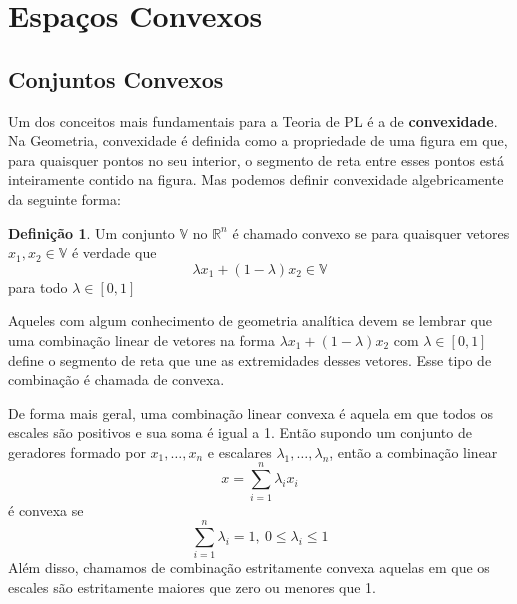 \theoremstyle{definition}

\newtheorem{def:conjunto convexo}{Definição}[chapter]

\newtheorem{def:politopo}[def:conjunto convexo]{Definição}

\newtheorem{def:poliedro convexo}[def:conjunto convexo]{Definição}

\newtheorem{def:cone}[def:conjunto convexo]{Definição}

\newtheorem{def:cone hull}[def:conjunto convexo]{Definição}

\newtheorem{def:cone convexo}[def:conjunto convexo]{Definição}

\newtheorem{def:cpc}[def:conjunto convexo]{Definição}



\section{Espaços Convexos}

\subsection{Conjuntos Convexos}

Um dos conceitos mais fundamentais para a Teoria de PL é a de \textbf{convexidade}. Na Geometria, convexidade é definida como a propriedade de uma figura em que, para quaisquer pontos no seu interior, o segmento de reta entre esses pontos está inteiramente contido na figura. Mas podemos definir convexidade algebricamente da seguinte forma:

\begin{def:conjunto convexo}
	\label{def:conjunto convexo}
	Um conjunto $\mathbb{V}$ no $\mathbb{R}^n$ é chamado convexo se para quaisquer vetores $x_1, x_2 \in \mathbb{V}$ é verdade que \[\lambda x_1 + (1 - \lambda)x_2 \in \mathbb{V}\] para todo $\lambda \in [0, 1]$
\end{def:conjunto convexo}

Aqueles com algum conhecimento de geometria analítica devem se lembrar que uma combinação linear de vetores na forma $\lambda x_1 + (1 - \lambda)x_2$ com $\lambda \in [0, 1]$ define o segmento de reta que une as extremidades desses vetores. Esse tipo de combinação é chamada de convexa.

De forma mais geral, uma combinação linear convexa é aquela em que todos os escales são positivos e sua soma é igual a 1. Então supondo um conjunto de geradores formado por $x_1, \ldots, x_n$ e escalares $\lambda_1, \ldots, \lambda_n$, então a combinação linear
\[x = \sum_{i=1}^{n} \lambda_i x_i\] é convexa se \[\sum_{i=1}^{n} \lambda_i = 1,\ 0 \leq \lambda_i \leq 1\]
Além disso, chamamos de combinação estritamente convexa aquelas em que os escales são estritamente maiores que zero ou menores que 1.


